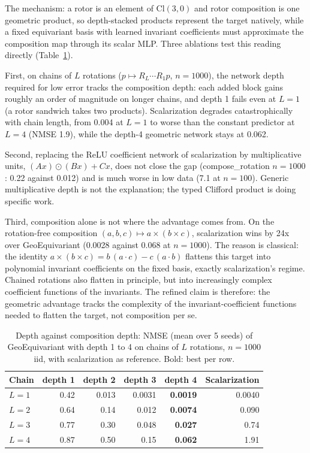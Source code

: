 \documentclass[11pt]{article}
\begin{document}
The mechanism: a rotor is an element of $\mathrm{Cl}(3,0)$ and rotor
composition is one geometric product, so depth-stacked products represent the
target natively, while a fixed equivariant basis with learned invariant
coefficients must approximate the composition map through its scalar MLP.
Three ablations test this reading directly (Table~\ref{tab:depth}).

First, on chains of $L$ rotations ($p \mapsto R_L \cdots R_1 p$,
$n{=}1000$), the network depth required for low error tracks the composition
depth: each added block gains roughly an order of magnitude on longer chains,
and depth 1 fails even at $L{=}1$ (a rotor sandwich takes two products).
Scalarization degrades catastrophically with chain length, from 0.004 at
$L{=}1$ to worse than the constant predictor at $L{=}4$ (NMSE 1.9), while the
depth-4 geometric network stays at 0.062.

Second, replacing the ReLU coefficient network of scalarization by
multiplicative units, $(Ax) \odot (Bx) + Cx$, does not close the gap
(compose\_rotation $n{=}1000$: 0.22 against 0.012) and is much worse in low
data (7.1 at $n{=}100$). Generic multiplicative depth is not the explanation;
the typed Clifford product is doing specific work.

Third, composition alone is not where the advantage comes from. On the
rotation-free composition $(a,b,c) \mapsto a \times (b \times c)$,
scalarization wins by 24x over GeoEquivariant (0.0028 against 0.068 at
$n{=}1000$). The reason is classical: the identity
$a \times (b \times c) = b\,(a \cdot c) - c\,(a \cdot b)$ flattens this
target into polynomial invariant coefficients on the fixed basis, exactly
scalarization's regime. Chained rotations also flatten in principle, but into
increasingly complex coefficient functions of the invariants. The refined
claim is therefore: the geometric advantage tracks the complexity of the
invariant-coefficient functions needed to flatten the target, not
composition per se.

\begin{table}[t]
\centering
\caption{Depth against composition depth: NMSE (mean over 5 seeds) of
GeoEquivariant with depth 1 to 4 on chains of $L$ rotations, $n{=}1000$ iid,
with scalarization as reference. Bold: best per row.}
\label{tab:depth}
\small
\begin{tabular}{lrrrrr}
\toprule
Chain & depth 1 & depth 2 & depth 3 & depth 4 & Scalarization \\
\midrule
$L{=}1$ & 0.42 & 0.013 & 0.0031 & \textbf{0.0019} & 0.0040 \\
$L{=}2$ & 0.64 & 0.14 & 0.012 & \textbf{0.0074} & 0.090 \\
$L{=}3$ & 0.77 & 0.30 & 0.048 & \textbf{0.027} & 0.74 \\
$L{=}4$ & 0.87 & 0.50 & 0.15 & \textbf{0.062} & 1.91 \\
\bottomrule
\end{tabular}
\end{table}
\end{document}
